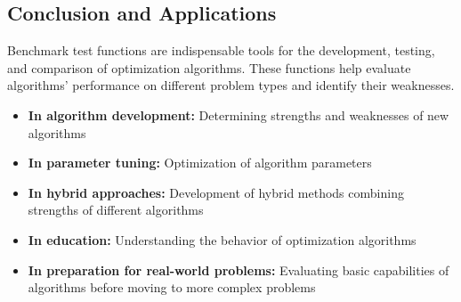 \subsection{Conclusion and Applications}

Benchmark test functions are indispensable tools for the development, testing, and comparison of optimization algorithms. These functions help evaluate algorithms' performance on different problem types and identify their weaknesses.

\begin{itemize}
    \item \textbf{In algorithm development:} Determining strengths and weaknesses of new algorithms
    \item \textbf{In parameter tuning:} Optimization of algorithm parameters
    \item \textbf{In hybrid approaches:} Development of hybrid methods combining strengths of different algorithms
    \item \textbf{In education:} Understanding the behavior of optimization algorithms
    \item \textbf{In preparation for real-world problems:} Evaluating basic capabilities of algorithms before moving to more complex problems
\end{itemize} 